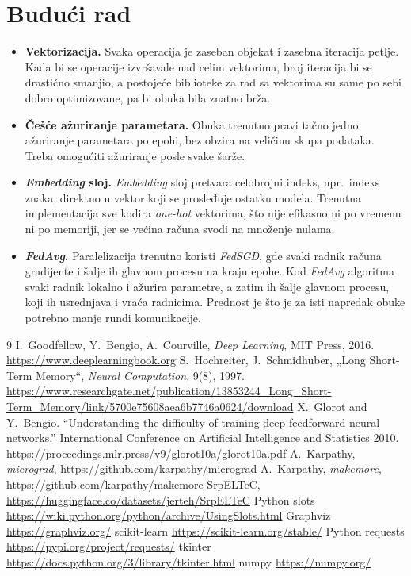 \documentclass[11pt,a4paper]{article}
\newcommand{\code}[1]{\texttt{\detokenize{#1}}}
\begin{document}
\section{Budući rad}
\begin{itemize}
  \item \textbf{Vektorizacija.} Svaka operacija je zaseban \code{Value} objekat
        i zasebna iteracija petlje. Kada bi se operacije izvršavale nad celim
        vektorima, broj iteracija bi se drastično smanjio, a postojeće
        biblioteke za rad sa vektorima su same po sebi dobro optimizovane, pa
        bi obuka bila znatno brža.
  \item \textbf{Češće ažuriranje parametara.} Obuka trenutno pravi tačno jedno
        ažuriranje parametara po epohi, bez obzira na veličinu skupa
        podataka. Treba omogućiti ažuriranje posle svake šarže.
  \item \textbf{\textit{Embedding} sloj.} \textit{Embedding} sloj pretvara
        celobrojni indeks, npr.\ indeks znaka, direktno u vektor koji se
        prosleđuje ostatku modela. Trenutna implementacija sve kodira
        \textit{one-hot} vektorima, što nije efikasno ni po vremenu ni po
        memoriji, jer se većina računa svodi na množenje nulama.
  \item \textbf{\textit{FedAvg}.} Paralelizacija trenutno koristi
        \textit{FedSGD}, gde svaki radnik računa gradijente i šalje ih glavnom
        procesu na kraju epohe. Kod \textit{FedAvg} algoritma svaki radnik
        lokalno i ažurira parametre, a zatim ih šalje glavnom procesu, koji ih
        usrednjava i vraća radnicima. Prednost je što je za isti napredak
        obuke potrebno manje rundi komunikacije.
\end{itemize}

\renewcommand{\refname}{Literatura}
\nocite{goodfellow}
\begin{thebibliography}{9}
 I.~Goodfellow, Y.~Bengio, A.~Courville, \textit{Deep Learning}, MIT Press, 2016. \url{https://www.deeplearningbook.org}
 S.~Hochreiter, J.~Schmidhuber, „Long Short-Term Memory“, \textit{Neural Computation}, 9(8), 1997. \url{https://www.researchgate.net/publication/13853244_Long_Short-Term_Memory/link/5700e75608aea6b7746a0624/download}
 X.~Glorot and Y.~Bengio. “Understanding the difficulty of training deep feedforward neural networks.” International Conference on Artificial Intelligence and Statistics 2010. \url{https://proceedings.mlr.press/v9/glorot10a/glorot10a.pdf}
 A.~Karpathy, \textit{micrograd}, \url{https://github.com/karpathy/micrograd}
 A.~Karpathy, \textit{makemore}, \url{https://github.com/karpathy/makemore}
 SrpELTeC, \url{https://huggingface.co/datasets/jerteh/SrpELTeC}
 Python slots \url{https://wiki.python.org/python/archive/UsingSlots.html}
 Graphviz \url{https://graphviz.org/}
 scikit-learn \url{https://scikit-learn.org/stable/}
 Python requests \url{https://pypi.org/project/requests/}
 tkinter \url{https://docs.python.org/3/library/tkinter.html}
 numpy \url{https://numpy.org/}
\end{thebibliography}
\end{document}
